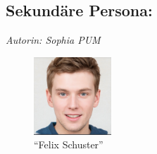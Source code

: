 \documentclass[12pt,paper=a4,oneside,hidelinks,headings=small,captions=heading,captions=nooneline]{scrartcl}
\begin{document}
\subsection{Sekundäre Persona:}
\label{sec:orgc63318a}

\emph{Autorin: Sophia PUM}

\begin{figure}[htbp]
\centering
\includegraphics[width=110px]{./img/m1_persona_3_rational.png}
\caption{\label{fig:persona3}"`Felix Schuster"'}
\end{figure}
\end{document}
